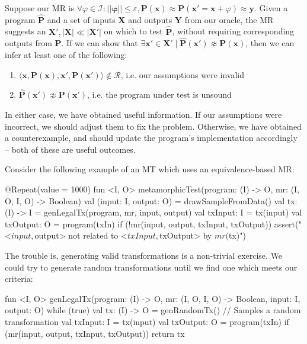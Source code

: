 \documentclass[12pt,initial,twoside,maitrise]{dms}
\numberwithin{equation}{section}
\numberwithin{table}{chapter}
\numberwithin{figure}{chapter}
\begin{document}
Suppose our MR is $\forall \varphi \in \mathcal I: ||\mathbf\varphi|| \leq \varepsilon, \mathbf P(\mathbf x) \approx \mathbf P(\mathbf x' = \mathbf x + \varphi) \approx \mathbf y$. Given a program $\mathbf{\hat P}$ and a set of inputs $\mathbf X$ and outputs $\mathbf Y$ from our oracle, the MR suggests an $\mathbf X', |\mathbf X| \ll |\mathbf X'|$ on which to test $\mathbf{\hat P}$, without requiring corresponding outputs from $\mathbf P$. If we can show that $\exists \mathbf x' \in \mathbf X' \mid \mathbf{\hat P}(\mathbf x') \not\approx \mathbf P(\mathbf x)$, then we can infer at least one of the following:

\begin{enumerate}
\item $\langle \mathbf x, \mathbf P(\mathbf x), \mathbf x', \mathbf P(\mathbf x')\rangle \notin \mathcal R$, i.e. our assumptions were invalid
\item $\mathbf{\hat P}(\mathbf x') \not\approx \mathbf{P}(\mathbf x')$, i.e. the program under test is unsound
\end{enumerate}
%
In either case, we have obtained useful information. If our assumptions were incorrect, we should adjust them to fix the problem. Otherwise, we have obtained a counterexample, and should update the program's implementation accordingly -- both of these are useful outcomes.

Consider the following example of an MT which uses an equivalence-based MR:

\begin{kotlinlisting}
@Repeat(value = 1000)
fun <I, O> metamorphicTest(program: (I) -> O, mr: (I, O, I, O) -> Boolean) {
    val (input: I, output: O) = drawSampleFromData()
    val tx: (I) -> I = genLegalTx(program, mr, input, output)
    val txInput: I = tx(input)
    val txOutput: O = program(txIn)
    if (!mr(input, output, txInput, txOutput))
        assert("<$input, $output> not related to <$txInput, $txOutput> by $mr ($tx)")
}
\end{kotlinlisting}
%
The trouble is, generating valid transformations is a non-trivial exercise. We could try to generate random transformations until we find one which meets our criteria:
%
\begin{kotlinlisting}
fun <I, O> genLegalTx(program: (I) -> O, mr: (I, O, I, O) -> Boolean, input: I, output: O) {
    while (true) {
        val tx: (I) -> O = genRandomTx() // Samples a random transformation
        val txInput: I = tx(input)
        val txOutput: O = program(txIn)
        if (mr(input, output, txInput, txOutput)) return tx
    }
}
\end{kotlinlisting}
\end{document}
